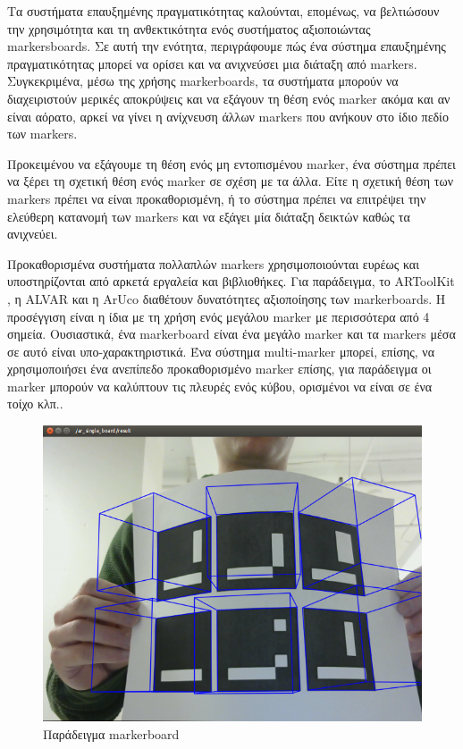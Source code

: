 Τα συστήματα επαυξημένης πραγματικότητας καλούνται, επομένως, να βελτιώσουν την χρησιμότητα και τη ανθεκτικότητα ενός συστήματος αξιοποιώντας markersboards. Σε αυτή την ενότητα, περιγράφουμε πώς ένα σύστημα επαυξημένης πραγματικότητας μπορεί να ορίσει και να ανιχνεύσει μια διάταξη από markers. Συγκεκριμένα, μέσω της χρήσης markerboards, τα συστήματα μπορούν να διαχειριστούν μερικές αποκρύψεις και να εξάγουν τη θέση ενός marker ακόμα και αν είναι αόρατο, αρκεί να γίνει η ανίχνευση άλλων markers που ανήκουν στο ίδιο πεδίο των markers. 


Προκειμένου να εξάγουμε τη θέση ενός μη εντοπισμένου marker, ένα σύστημα πρέπει να ξέρει τη σχετική θέση ενός marker σε σχέση με τα άλλα. Είτε η σχετική θέση των markers πρέπει να είναι προκαθορισμένη, ή το σύστημα πρέπει να επιτρέψει την ελεύθερη κατανομή των markers και να εξάγει μία διάταξη δεικτών καθώς τα ανιχνεύει. 


Προκαθορισμένα συστήματα πολλαπλών markers χρησιμοποιούνται ευρέως και υποστηρίζονται από αρκετά εργαλεία και βιβλιοθήκες. 
Για παράδειγμα, το ARToolKit \cite{artoolkit}, η ALVAR \cite{alvar} και η ArUco\cite{aruco} διαθέτουν δυνατότητες αξιοποίησης των markerboards. Η προσέγγιση είναι η ίδια με τη χρήση ενός μεγάλου marker με περισσότερα από 4 σημεία. Ουσιαστικά, ένα markerboard είναι ένα μεγάλο marker και τα markers μέσα σε αυτό είναι υπο-χαρακτηριστικά. Ένα σύστημα multi-marker μπορεί, επίσης, να χρησιμοποιήσει ένα ανεπίπεδο προκαθορισμένο marker επίσης, για παράδειγμα οι marker μπορούν να καλύπτουν τις πλευρές ενός κύβου, ορισμένοι να είναι σε ένα τοίχο κλπ.\cite{uematsu2005ar}.


\begin{figure}[H]
    \centering
    \includegraphics[scale=0.35]{Files/Figures/markerboard_example.png}
    \caption[Παράδειγμα markerboard]{Παράδειγμα markerboard}
    \label{fig:coordinatesDiagram}
\end{figure}




